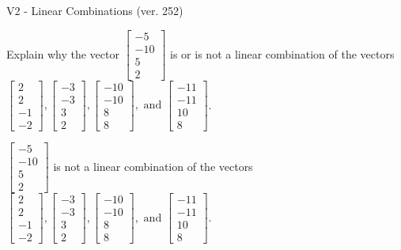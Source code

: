 \begin{exercise}
  \begin{exerciseTitle}V2 - Linear Combinations (ver. 252)\end{exerciseTitle}
  \begin{exerciseStatement}
    Explain why the vector \(\left[\begin{array}{c}
-5 \\
-10 \\
5 \\
2
\end{array}\right]\)  is or is not a linear 
	combination of the vectors \(\left[\begin{array}{c}
2 \\
2 \\
-1 \\
-2
\end{array}\right] , \left[\begin{array}{c}
-3 \\
-3 \\
3 \\
2
\end{array}\right] , \left[\begin{array}{c}
-10 \\
-10 \\
8 \\
8
\end{array}\right] , \text{ and } \left[\begin{array}{c}
-11 \\
-11 \\
10 \\
8
\end{array}\right]\).
	


  \end{exerciseStatement}
  \begin{exerciseAnswer}
   \(\left[\begin{array}{c}
-5 \\
-10 \\
5 \\
2
\end{array}\right]\) 
  	 is not  
	a linear combination of the vectors \(\left[\begin{array}{c}
2 \\
2 \\
-1 \\
-2
\end{array}\right] , \left[\begin{array}{c}
-3 \\
-3 \\
3 \\
2
\end{array}\right] , \left[\begin{array}{c}
-10 \\
-10 \\
8 \\
8
\end{array}\right] , \text{ and } \left[\begin{array}{c}
-11 \\
-11 \\
10 \\
8
\end{array}\right]\).


\end{exerciseAnswer}
\end{exercise}
